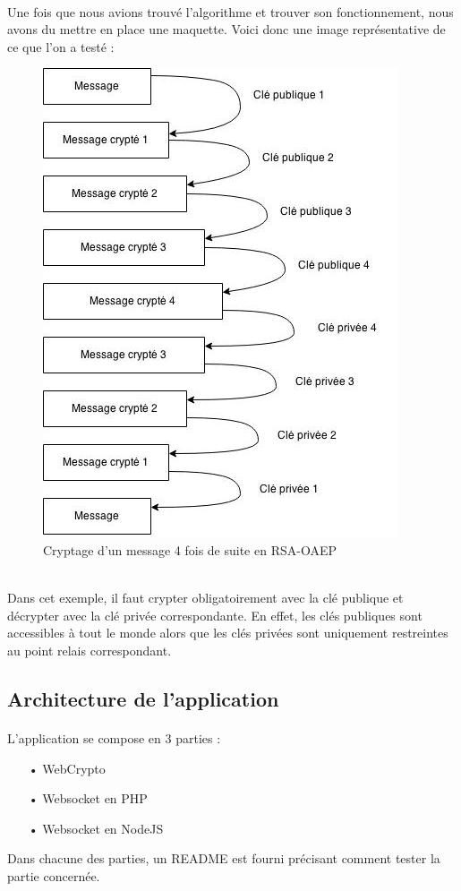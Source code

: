 \documentclass[a4paper,12pt]{report}
\begin{document}
	\paragraph*{}
	Une fois que nous avions trouvé l'algorithme et trouver son fonctionnement, nous avons du mettre en place une maquette. Voici donc une image représentative de ce que l'on a testé :
	\begin{figure}[h] %
		\includegraphics[scale=0.70]{RSA.jpg}
		\caption{Cryptage d'un message 4 fois de suite en RSA-OAEP}
		\label{RSA}
	\end{figure}
	\\
	Dans cet exemple, il faut crypter obligatoirement avec la clé publique et décrypter avec la clé privée correspondante. En effet, les clés publiques sont accessibles à tout le monde alors que les clés privées sont uniquement restreintes au point relais correspondant.

	\subsection{Architecture de l'application}
	\paragraph*{}
	L'application se compose en 3 parties :\\
	\begin{itemize}
		\item[•]WebCrypto
		\item[•]Websocket en PHP
		\item[•]Websocket en NodeJS
	\end{itemize}
	Dans chacune des parties, un README est fourni précisant comment tester la partie concernée.
\end{document}
